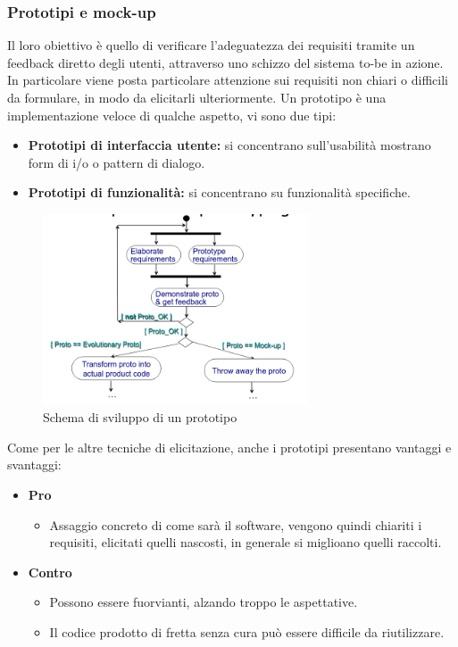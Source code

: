 \documentclass[../main.tex]{subfiles}
\begin{document}
\subsubsection{Prototipi e mock-up}
Il loro obiettivo è quello di verificare l'adeguatezza dei requisiti tramite un feedback diretto degli utenti, attraverso uno schizzo del sistema to-be in azione.
In particolare viene posta particolare attenzione sui requisiti non chiari o difficili da formulare, in modo da elicitarli ulteriormente.
Un prototipo è una implementazione veloce di qualche aspetto, vi sono due tipi:
\begin{itemize}
	\item \textbf{Prototipi di interfaccia utente:} si concentrano sull'usabilità mostrano form di i/o o pattern di dialogo.
	\item \textbf{Prototipi di funzionalità:} si concentrano su funzionalità specifiche.
\end{itemize}
\begin{figure}[h]
	\centering
	\includegraphics[width=0.7\textwidth]{pictures/schemaPrototipo.png}
	\caption{Schema di sviluppo di un prototipo}
\end{figure}
Come per le altre tecniche di elicitazione, anche i prototipi presentano vantaggi e svantaggi:
\begin{itemize}
	\item \textbf{Pro}
	\begin{itemize}
		\item Assaggio concreto di come sarà il software, vengono quindi chiariti i requisiti, elicitati quelli nascosti, in generale si miglioano quelli raccolti.
	\end{itemize}
	\item \textbf{Contro}
	\begin{itemize}
		\item Possono essere fuorvianti, alzando troppo le aspettative.
		\item Il codice prodotto di fretta senza cura può essere difficile da riutilizzare. 
		\end{itemize}
\end{itemize}
\end{document}
